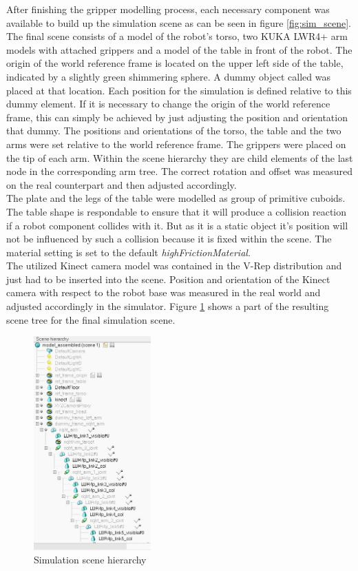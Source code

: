 After finishing the gripper modelling process, each necessary component was available to build up the simulation scene as can be seen in figure \ref{fig:sim_scene}. The final scene consists of a model of the robot's torso, two KUKA LWR4+ arm models with attached grippers and a model of the table in front of the robot. The origin of the world reference frame is located on the upper left side of the table, indicated by a slightly green shimmering sphere. A dummy object called  was placed at that location. Each position for the simulation is defined relative to this dummy element. If it is necessary to change the origin of the world reference frame, this can simply be achieved by just adjusting the position and orientation that dummy. The positions and orientations of the torso, the table and the two arms were set relative to the world reference frame. The grippers were placed on the tip of each arm. Within the scene hierarchy they are child elements of the last node in the corresponding arm tree. The correct rotation and offset was measured on the real counterpart and then adjusted accordingly. \\

The plate and the legs of the table were modelled as group of primitive cuboids. The table shape is respondable to ensure that it will produce a collision reaction if a robot component collides with it. But as it is a static object it's position will not be influenced by such a collision because it is fixed within the scene. The material setting is set to the default \emph{highFrictionMaterial}. \\

The utilized Kinect camera model was contained in the V-Rep distribution and just had to be inserted into the scene. Position and orientation of the Kinect camera with respect to the robot base was measured in the real world and adjusted accordingly in the simulator. Figure \ref{fig:sim_scene_tree} shows a part of the resulting scene tree for the final simulation scene. 

\begin{figure}[h]
	\centering
  	\includegraphics[width=0.4\textwidth]{images/scene_tree.jpg}
	\caption{Simulation scene hierarchy}
	\label{fig:sim_scene_tree}
\end{figure}

